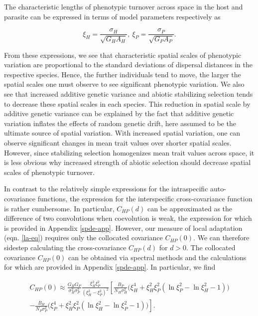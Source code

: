 \documentclass{article}
\begin{document}
The characteristic lengths of phenotypic turnover across space in the
host and parasite can be expressed in terms of model parameters
respectively as

\begin{equation}\label{char-len}
  \xi_H = \frac{\sigma_H}{\sqrt{G_HA_H}}, \ \xi_P = \frac{\sigma_P}{\sqrt{G_PA_P}}.
\end{equation}

From these expressions, we see that characteristic spatial scales of
phenotypic variation are proportional to the standard deviations of
dispersal distances in the respective species. Hence, the further
individuals tend to move, the larger the spatial scales one must observe
to see significant phenotypic variation. We also see that increased
additive genetic variance and abiotic stabilizing selection tends to
decrease these spatial scales in each species. This reduction in spatial
scale by additive genetic variance can be explained by the fact that
additive genetic variation inflates the effects of random genetic drift,
here assumed to be the ultimate source of spatial variation. With
increased spatial variation, one can observe significant changes in mean
trait values over shorter spatial scales. However, since stabilizing
selection homogenizes mean trait values across space, it is less obvious
why increased strength of abiotic selection should decrease spatial
scales of phenotypic turnover.

In contrast to the relatively simple expressions for the intraspecific
auto-covariance functions, the expression for the interspecific
cross-covariance function is rather cumbersome. In particular,
\(C_{HP}(d)\) can be approximated as the difference of two convolutions
when coevolution is weak, the expression for which is provided in
Appendix \ref{spde-app}. However, our measure of local adaptation (eqn.
\ref{la-eq}) requires only the collocated covariance \(C_{HP}(0)\). We
can therefore sidestep calculating the cross-covariance \(C_{HP}(d)\)
for \(d>0\). The collocated covariance \(C_{HP}(0)\) can be obtained via
spectral methods and the calculations for which are provided in Appendix
\ref{spde-app}. In particular, we find

\begin{multline}\label{collocated}
  C_{HP}(0)\approx \frac{G_HG_P}{\sigma_H^2\sigma_P^2}\frac{\xi_H^2\xi_P^2}{(\xi_H^2-\xi_P^2)^2}\left[\frac{B_P}{ N_H\sigma_H^2}\Big(\xi_H^4+\xi_H^2\xi_P^2(\ln\xi_P^2-\ln\xi_H^2-1)\Big)\right. \\
  \left.-\frac{B_H}{ N_P\sigma_P^2}\Big(\xi_P^4+\xi_H^2\xi_P^2(\ln\xi_H^2-\ln\xi_P^2-1)\Big)\right].
\end{multline}
\end{document}
